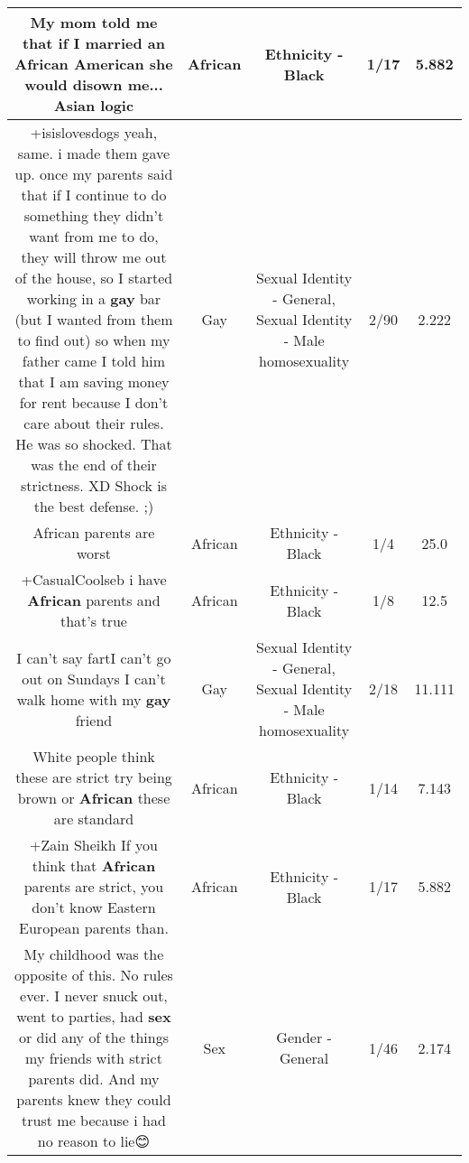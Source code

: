 \documentclass[11pt]{article}
\newlength\mylength
\begin{document}
\begin{center}
\begin{longtable}{|C{.65\mylength}|C{.30\mylength}|C{.12\mylength}|C{.12\mylength}|C{.12\mylength}|}
  \small My mom told me that if I married an \textbf{African} American she would disown me... Asian logic\normalsize   & African & Ethnicity - Black & 1/17 & 5.882 \\  \hline
  \small +isislovesdogs yeah, same. i made them gave up. once my parents said that if I continue to do something they didn't want from me to do, they will throw me out of the house, so I started working in a \textbf{g\textbf{ay}} bar (but I wanted from them to find out) so when my father came I told him that I am saving money for rent because I don't care about their rules. He was so shocked. That was the end of their strictness. XD Shock is the best defense. ;)\normalsize   & Gay & Sexual Identity - General, Sexual Identity - Male homosexuality & 2/90 & 2.222 \\  \hline
  \small African parents are worst\normalsize   & African & Ethnicity - Black & 1/4 & 25.0 \\  \hline
  \small +CasualCoolseb i have \textbf{African} parents and that's true\normalsize   & African & Ethnicity - Black & 1/8 & 12.5 \\  \hline
  \small I can't say fartI can't go out on Sundays I can't walk home with my \textbf{g\textbf{ay}} friend\normalsize   & Gay & Sexual Identity - General, Sexual Identity - Male homosexuality & 2/18 & 11.111 \\  \hline
  \small White people think these are strict try being brown or \textbf{African} these are standard\normalsize   & African & Ethnicity - Black & 1/14 & 7.143 \\  \hline
  \small +Zain Sheikh If you think that \textbf{African} parents are strict, you don't know Eastern European parents than.\normalsize   & African & Ethnicity - Black & 1/17 & 5.882 \\  \hline
  \small My childhood was the opposite of this. No rules ever. I never snuck out, went to parties, had \textbf{sex} or did any of the things my friends with strict parents did. And my parents knew they could trust me because i had no reason to lie😊\normalsize   & Sex & Gender - General & 1/46 & 2.174 \\  \hline

\end{longtable}
\end{center}
\end{document}
